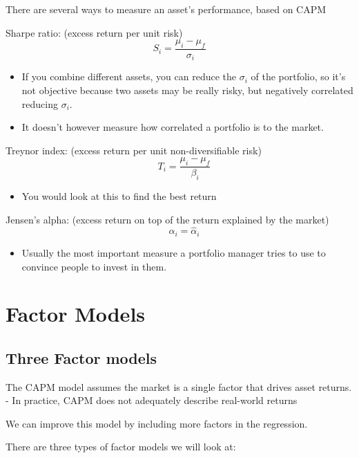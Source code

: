 \documentclass[
  oneside]{book}
\providecommand{\tightlist}{%
  \setlength{\itemsep}{0pt}\setlength{\parskip}{0pt}}
\begin{document}
There are several ways to measure an asset's performance, based on CAPM

Sharpe ratio: (excess return per unit risk)
\[
S_i=\frac{\mu_i-\mu_f}{\sigma_i}
\]

\begin{itemize}
\tightlist
\item
  If you combine different assets, you can reduce the \(\sigma_{i}\) of the portfolio, so it's not objective because two assets may be really risky, but negatively correlated reducing \(\sigma_{i}\).
\item
  It doesn't however measure how correlated a portfolio is to the market.
\end{itemize}

Treynor index: (excess return per unit non-diversifiable risk)
\[
\quad T_i=\frac{\mu_i-\mu_f}{\beta_i}
\]

\begin{itemize}
\tightlist
\item
  You would look at this to find the best return
\end{itemize}

Jensen's alpha: (excess return on top of the return explained by the market)
\[
\quad \alpha_i=\hat{\alpha}_i
\]

\begin{itemize}
\tightlist
\item
  Usually the most important measure a portfolio manager tries to use to convince people to invest in them.
\end{itemize}

\hypertarget{factor-models}{%
\chapter{Factor Models}\label{factor-models}}

\hypertarget{three-factor-models}{%
\section{Three Factor models}\label{three-factor-models}}

The CAPM model assumes the market is a single factor that drives asset returns.
- In practice, CAPM does not adequately describe real-world returns

We can improve this model by including more factors in the regression.

There are three types of factor models we will look at:
\end{document}

